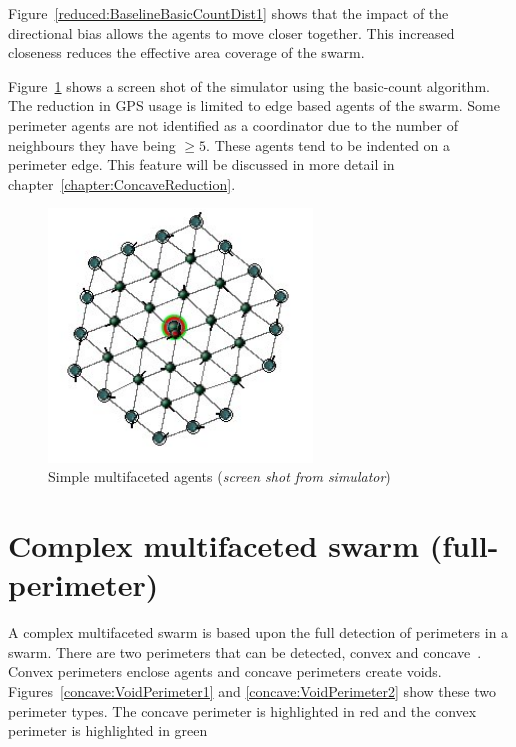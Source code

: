 Figure~\ref{reduced:BaselineBasicCountDist1} shows that the impact of the directional bias allows the agents to move closer together. This increased closeness reduces the effective area coverage of the swarm. 

Figure~\ref{reduced:SimpleMulti12} shows a screen shot of the simulator using the basic-count algorithm. The reduction in GPS usage is limited to edge based agents of the swarm. Some perimeter agents are not identified as a coordinator due to the number of neighbours they have being $\geq5$. These agents tend to be indented on a perimeter edge. This feature will be discussed in more detail in chapter~\ref{chapter:ConcaveReduction}.

\begin{figure}[H]
\begin{center}
\includegraphics[width=7cm]{CHAPTER-6/figures/SimpleMulti2}
\end{center}
\caption[Simple multifaceted agents]{Simple multifaceted agents (\textit{screen shot from simulator})\label{reduced:SimpleMulti12}}
\end{figure}

\section{Complex multifaceted swarm (full-perimeter)}\label{sec:complexMulti} 
A complex multifaceted swarm is based upon the full detection of perimeters in a swarm. There are two perimeters that can be detected, convex and concave~\cite{MD:09,MJ:08}. Convex perimeters enclose agents and concave perimeters create voids. Figures~\ref{concave:VoidPerimeter1} and \ref{concave:VoidPerimeter2} show these two perimeter types. The concave perimeter is highlighted in red and the convex perimeter is highlighted in green

